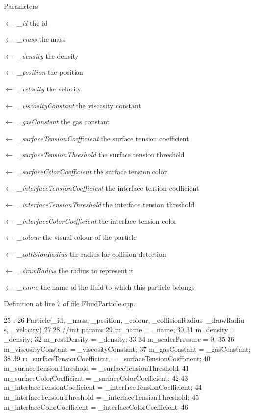 \begin{DoxyParams}{Parameters}
\item[\mbox{$\leftarrow$} {\em \_\-id}]the id \item[\mbox{$\leftarrow$} {\em \_\-mass}]the mass \item[\mbox{$\leftarrow$} {\em \_\-density}]the density \item[\mbox{$\leftarrow$} {\em \_\-position}]the position \item[\mbox{$\leftarrow$} {\em \_\-velocity}]the velocity \item[\mbox{$\leftarrow$} {\em \_\-viscosityConstant}]the viscosity constant \item[\mbox{$\leftarrow$} {\em \_\-gasConstant}]the gas constant \item[\mbox{$\leftarrow$} {\em \_\-surfaceTensionCoefficient}]the surface tension coefficient \item[\mbox{$\leftarrow$} {\em \_\-surfaceTensionThreshold}]the surface tension threshold \item[\mbox{$\leftarrow$} {\em \_\-surfaceColorCoefficient}]the surface tension color \item[\mbox{$\leftarrow$} {\em \_\-interfaceTensionCoefficient}]the interface tension coefficient \item[\mbox{$\leftarrow$} {\em \_\-interfaceTensionThreshold}]the interface tension threshold \item[\mbox{$\leftarrow$} {\em \_\-interfaceColorCoefficient}]the interface tension color \item[\mbox{$\leftarrow$} {\em \_\-colour}]the visual colour of the particle \item[\mbox{$\leftarrow$} {\em \_\-collisionRadius}]the radius for collision detection \item[\mbox{$\leftarrow$} {\em \_\-drawRadius}]the radius to represent it \item[\mbox{$\leftarrow$} {\em \_\-name}]the name of the fluid to which this particle belongs \end{DoxyParams}


Definition at line 7 of file FluidParticle.cpp.




\begin{DoxyCode}
25               :
26             Particle(_id, _mass, _position, _colour, _collisionRadius, _drawRadiu
      s, _velocity)
27 {
28     //init params
29     m_name = _name;
30 
31     m_density = _density;
32     m_restDensity = _density;
33 
34     m_scalerPressure = 0;
35 
36     m_viscosityConstant = _viscosityConstant;
37     m_gasConstant = _gasConstant;
38 
39     m_surfaceTensionCoefficient = _surfaceTensionCoefficient;
40     m_surfaceTensionThreshold = _surfaceTensionThreshold;
41     m_surfaceColorCoefficient = _surfaceColorCoefficient;
42 
43     m_interfaceTensionCoefficient = _interfaceTensionCoefficient;
44     m_interfaceTensionThreshold = _interfaceTensionThreshold;
45     m_interfaceColorCoefficient = _interfaceColorCoefficient;
46 }
\end{DoxyCode}


